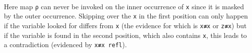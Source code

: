 \begin{fence}
\begin{code}
\AgdaSymbol{\}}\<%
\\
\>[.][@{}l@{}]\<[572I]%
\>[4]%
\>[576I]\AgdaSpace{}%
\AgdaOperator{\AgdaInductiveConstructor{,}}\AgdaSpace{}%
\AgdaSpace{}%
\AgdaSpace{}%
\AgdaSpace{}%
\AgdaOperator{\AgdaInductiveConstructor{,}}\AgdaSpace{}%
\AgdaSpace{}%
\AgdaSpace{}%
\AgdaSpace{}%
\AgdaSpace{}%
\AgdaSpace{}%
\AgdaSpace{}%
\<%
\\
\>[.][@{}l@{}]\<[576I]%
\>[6]\AgdaComment{-------------------------}\<%
\\
%
\>[4]\AgdaSpace{}%
\AgdaSpace{}%
\AgdaOperator{\AgdaInductiveConstructor{,}}\AgdaSpace{}%
\AgdaSpace{}%
\AgdaSpace{}%
\AgdaSpace{}%
\AgdaSpace{}%
\AgdaSpace{}%
\AgdaSpace{}%
\<%
\\
%
\>[2]\AgdaSpace{}%
%
\>[22]\AgdaSymbol{=}%
\>[25]\<%
\\
%
\>[2]\AgdaSpace{}%
\AgdaSymbol{(}\AgdaSpace{}%
\AgdaSpace{}%
\AgdaSymbol{)}%
\>[22]\AgdaSymbol{=}%
\>[25]\AgdaSpace{}%
\AgdaSymbol{(}\AgdaSpace{}%
\AgdaSymbol{)}\<%
\\
%
\>[2]\AgdaSpace{}%
\AgdaSymbol{(}\AgdaSpace{}%
\AgdaSpace{}%
\AgdaSymbol{(}\AgdaSpace{}%
\AgdaSymbol{\AgdaUnderscore{}}\AgdaSpace{}%
\AgdaSymbol{))}%
\>[22]\AgdaSymbol{=}%
\>[25]\AgdaSpace{}%
\AgdaSpace{}%
\<%
\end{code}
\end{fence}

Here map \texttt{ρ} can never be invoked on the inner occurrence of
\texttt{x} since it is masked by the outer occurrence. Skipping over the
\texttt{x} in the first position can only happen if the variable looked
for differs from \texttt{x} (the evidence for which is \texttt{x≢x} or
\texttt{z≢x}) but if the variable is found in the second position, which
also contains \texttt{x}, this leads to a contradiction (evidenced by
\texttt{x≢x\ refl}).

